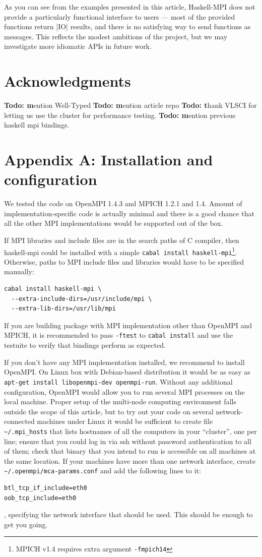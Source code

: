 \documentclass{tmr}
\newcommand{\Todo}[1]{{\textbf{Todo: #1}}}
\begin{document}
As you can see from the examples presented in this article, Haskell-MPI
does not provide a particularly functional interface to users --- most of the provided functions return
|IO| results, and there is no satisfying way to send functions as messages. This reflects the
modest ambitions of the project, but we may investigate more idiomatic APIs in future work.

\section{Acknowledgments}

\Todo mention Well-Typed
\Todo mention article repo
\Todo thank VLSCI for letting us use the cluster for performance testing.
\Todo mention previous haskell mpi bindings.

\section{Appendix A: Installation and configuration}
\label{appendix-A}
We tested the code on OpenMPI 1.4.3 and MPICH 1.2.1 and 1.4. Amount of
implementation-specific code is actually minimal and there is a good
chance that all the other MPI implementations would be supported out
of the box.

If MPI libraries and include files are in the search paths of C
compiler, then haskell-mpi could be installed with a simple 
\verb|cabal install haskell-mpi|\footnote{MPICH v1.4 requires extra argument \verb|-fmpich14|}. Otherwise, paths to MPI include
files and libraries would have to be specified manually:
\begin{Verbatim}
cabal install haskell-mpi \
  --extra-include-dirs=/usr/include/mpi \
  --extra-lib-dirs=/usr/lib/mpi
\end{Verbatim}

If you are building package with MPI implementation other than
OpenMPI and MPICH, it is recommended to pass \verb|-ftest| to
\verb|cabal install| and use the testuite to verify that bindings
perform as expected.

If you don't have any MPI implementation installed, we recommend to
install OpenMPI. On Linux box with Debian-based distribution it would
be as easy as \verb|apt-get install libopenmpi-dev openmpi-run|.
Without any additional configuration, OpenMPI would allow you to run
several MPI processes on the local machine. Proper setup of the
multi-node computing environment falls outside the scope of this
article, but to try out your code on several network-connected
machines under Linux it would be sufficient to create file \verb|~/.mpi_hosts|
that lists hostnames of all the computers in your ``cluster'', one per
line; ensure that you could log in via ssh without password
authentication to all of them; check that binary that you intend to
run is accessible on all machines at the same location. If your
machines have more than one network interface, create
\verb|~/.openmpi/mca-params.conf| and add the following lines to it:
\begin{Verbatim}
btl_tcp_if_include=eth0
oob_tcp_include=eth0
\end{Verbatim}
, specifying the network interface that should be used. This should be enough to get you going.


\end{document}
